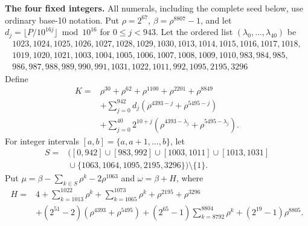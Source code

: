 \documentclass[10pt]{article}
\begin{document}
\bigskip\textbf{The four fixed integers.} All numerals, including the complete seed below, use ordinary base-10 notation. Put $\rho=2^{67}$, $\beta=\rho^{8807}-1$, and let $d_j=\lfloor P/10^{16j}\rfloor\bmod 10^{16}$ for $0\le j<943$.
Let the ordered list $(\lambda_0,\ldots,\lambda_{40})$ be
\[\begin{gathered}
1023,1024,1025,1026,1027,1028,1029,1030,1013,1014,1015,1016,1017,1018,\\
1019,1020,1021,1003,1004,1005,1006,1007,1008,1009,1010,983,984,985,\\
986,987,988,989,990,991,1031,1022,1011,992,1095,2195,3296
\end{gathered}\]
Define
\[\begin{split}
K={}&\rho^{30}+\rho^{62}+\rho^{1100}+\rho^{2201}+\rho^{8849}\\
&+\sum_{j=0}^{942}d_j(\rho^{4393-j}+\rho^{5495-j})\\
&+\sum_{j=0}^{40}2^{10+j}(\rho^{4393-\lambda_j}+\rho^{5495-\lambda_j}).
\end{split}\]
For integer intervals $[a,b]=\{a,a+1,\ldots,b\}$, let
\[\begin{split}S={}&([0,942]\cup[983,992]\cup[1003,1011]\cup[1013,1031]\\&{}\cup\{1063,1064,1095,2195,3296\})\setminus\{1\}.\end{split}\]
Put $\mu=\beta-\sum_{k\in S}\rho^k-2\rho^{1063}$ and $\omega=\beta+H$, where
\[\begin{split}
H={}&4+\sum_{k=1013}^{1022}\rho^k+\sum_{k=1065}^{1073}\rho^k+\rho^{2195}+\rho^{3296}\\
&+(2^{51}-2)(\rho^{4393}+\rho^{5495})+(2^{65}-1)\sum_{k=8792}^{8804}\rho^k+(2^{19}-1)\rho^{8805}.
\end{split}\]
\end{document}
